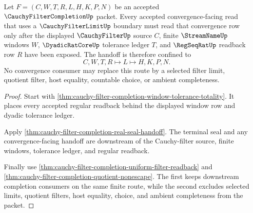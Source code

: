 \begin{theorem}
\label{thm:cauchy-filter-completion-filter-convergence-handoff}
Let $F=(C,W,T,R,L,H,K,P,N)$ be an accepted $\CauchyFilterCompletionUp$ packet. Every accepted convergence-facing read that uses a $\CauchyFilterLimitUp$ boundary must read that convergence row only after the displayed $\CauchyFilterUp$ source $C$, finite $\StreamNameUp$ windows $W$, $\DyadicRatCoreUp$ tolerance ledger $T$, and $\RegSeqRatUp$ readback row $R$ have been exposed. The handoff is therefore confined to
$$
C,W,T,R \longmapsto L \longmapsto H,K,P,N .
$$
No convergence consumer may replace this route by a selected filter limit, quotient filter, host equality, countable choice, or ambient completeness.
\end{theorem}
\begin{proof}
Start with \autoref{thm:cauchy-filter-completion-window-tolerance-totality}. It places every accepted regular readback behind the displayed window row and dyadic tolerance ledger.

Apply \autoref{thm:cauchy-filter-completion-real-seal-handoff}. The terminal seal and any convergence-facing handoff are downstream of the Cauchy-filter source, finite windows, tolerance ledger, and regular readback.

Finally use \autoref{thm:cauchy-filter-completion-uniform-filter-readback} and \autoref{thm:cauchy-filter-completion-quotient-nonescape}. The first keeps downstream completion consumers on the same finite route, while the second excludes selected limits, quotient filters, host equality, choice, and ambient completeness from the packet.
\end{proof}

